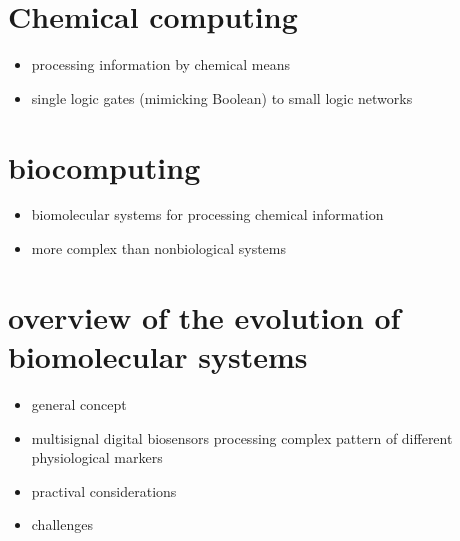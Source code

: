 \documentclass[12pt]{article}
\begin{document}
\section{Chemical computing}
\begin{itemize}
	\item processing information by chemical means 
	\item single logic gates (mimicking Boolean) to small logic networks
\end{itemize}
\section{biocomputing}
\begin{itemize}
	\item biomolecular systems for processing chemical information
	\item more complex than nonbiological systems 
\end{itemize}


\section{overview of the evolution of biomolecular systems}
\begin{itemize}
	\item general concept 
	\item multisignal digital biosensors processing complex pattern of different physiological markers
	\item practival considerations
	\item challenges
	
\end{itemize}
\end{document}
